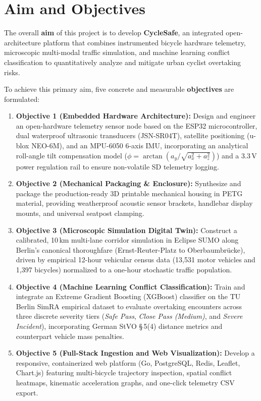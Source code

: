 \section{Aim and Objectives}
\label{sec:aim_objectives}
The overall \textbf{aim} of this project is to develop \textbf{CycleSafe}, an integrated open-architecture platform that combines instrumented bicycle hardware telemetry, microscopic multi-modal traffic simulation, and machine learning conflict classification to quantitatively analyze and mitigate urban cyclist overtaking risks.

To achieve this primary aim, five concrete and measurable \textbf{objectives} are formulated:
\begin{enumerate}
    \item \textbf{Objective 1 (Embedded Hardware Architecture):} Design and engineer an open-hardware telemetry sensor node based on the ESP32 microcontroller, dual waterproof ultrasonic transducers (JSN-SR04T), satellite positioning (u-blox NEO-6M), and an MPU-6050 6-axis IMU, incorporating an analytical roll-angle tilt compensation model ($\phi = \arctan(a_y / \sqrt{a_x^2 + a_z^2})$) and a 3.3\,V power regulation rail to ensure non-volatile SD telemetry logging.
    \item \textbf{Objective 2 (Mechanical Packaging \& Enclosure):} Synthesize and package the production-ready 3D printable mechanical housing in PETG material, providing weatherproof acoustic sensor brackets, handlebar display mounts, and universal seatpost clamping.
    \item \textbf{Objective 3 (Microscopic Simulation Digital Twin):} Construct a calibrated, 10\,km multi-lane corridor simulation in Eclipse SUMO along Berlin's canonical thoroughfare (Ernst-Reuter-Platz to Oberbaumbr{\"u}cke), driven by empirical 12-hour vehicular census data (13,531 motor vehicles and 1,397 bicycles) normalized to a one-hour stochastic traffic population.
    \item \textbf{Objective 4 (Machine Learning Conflict Classification):} Train and integrate an Extreme Gradient Boosting (XGBoost) classifier on the TU Berlin SimRA empirical dataset to evaluate overtaking encounters across three discrete severity tiers (\textit{Safe Pass}, \textit{Close Pass (Medium)}, and \textit{Severe Incident}), incorporating German StVO \S\,5(4) distance metrics and counterpart vehicle mass penalties.
    \item \textbf{Objective 5 (Full-Stack Ingestion and Web Visualization):} Develop a responsive, containerized web platform (Go, PostgreSQL, Redis, Leaflet, Chart.js) featuring multi-bicycle trajectory inspection, spatial conflict heatmaps, kinematic acceleration graphs, and one-click telemetry CSV export.
\end{enumerate}

